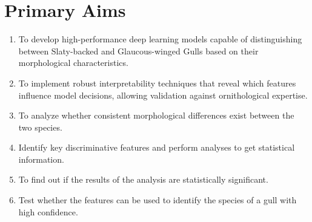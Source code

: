 \documentclass[a4paper,12pt]{report}
\begin{document}
\section{Primary Aims}
\begin{enumerate}
    \item To develop high-performance deep learning models capable of distinguishing between Slaty-backed and Glaucous-winged Gulls based on their morphological characteristics.
    \item To implement robust interpretability techniques that reveal which features influence model decisions, allowing validation against ornithological expertise.
    \item To analyze whether consistent morphological differences exist between the two species. 
    \item Identify key discriminative features and perform analyses to get statistical information.
    \item To find out if the results of the analysis are statistically significant.
    \item Test whether the features can be used to identify the species of a gull with high confidence.
\end{enumerate}
\end{document}

